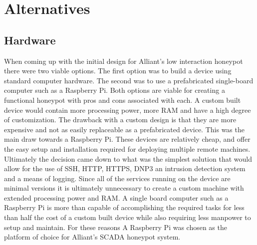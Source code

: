 \chapter{Alternatives}

\section{Hardware}
When coming up with the initial design for Alliant's low interaction honeypot there were two viable options. The first option was to build a device using standard computer hardware. The second was to use a prefabricated single-board computer such as a Raspberry Pi. Both options are viable for creating a functional honeypot with pros and cons associated with each. A custom built device would contain more processing power, more RAM and have a high degree of customization. The drawback with a custom design is that they are more expensive and not as easily replaceable as a prefabricated device. This was the main draw towards a Raspberry Pi. These devices are relatively cheap, and offer the easy setup and installation required for deploying multiple remote machines. Ultimately the decision came down to what was the simplest solution that would allow for the use of SSH, HTTP, HTTPS, DNP3 an intrusion detection system and a means of logging. Since all of the services running  on the device are minimal versions it is ultimately unnecessary to create a custom machine with extended processing power and RAM. A single board computer such as a Raspberry Pi is more than capable of accomplishing the required tasks for less than half the cost of a custom built device while also requiring less manpower to setup and maintain. For these reasons A Raspberry Pi was chosen as the platform of choice for Alliant's SCADA honeypot system.

